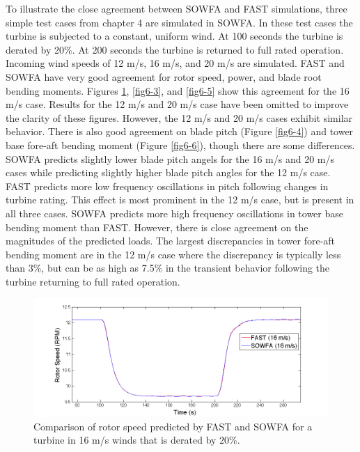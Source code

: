 To illustrate the close agreement between SOWFA and FAST simulations, three simple test cases from chapter 4 are simulated in SOWFA. In these test cases the turbine is subjected to a constant, uniform wind. At 100 seconds the turbine is derated by 20\%. At 200 seconds the turbine is returned to full rated operation. Incoming wind speeds of 12 m/s, 16 m/s, and 20 m/s are simulated. FAST and SOWFA have very good agreement for rotor speed, power, and blade root bending moments. Figures \ref{fig6-2}, \ref{fig6-3}, and \ref{fig6-5} show this agreement for the 16 m/s case. Results for the 12 m/s and 20 m/s case have been omitted to improve the clarity of these figures. However, the 12 m/s and 20 m/s cases exhibit similar behavior. There is also good agreement on blade pitch (Figure \ref{fig6-4}) and tower base fore-aft bending moment (Figure \ref{fig6-6}), though there are some differences. SOWFA predicts slightly lower blade pitch angels for the 16 m/s and 20 m/s cases while predicting slightly higher blade pitch angles for the 12 m/s case. FAST predicts more low frequency oscillations in pitch following changes in turbine rating. This effect is most prominent in the 12 m/s case, but is present in all three cases. SOWFA predicts more high frequency oscillations in tower base bending moment than FAST. However, there is close agreement on the magnitudes of the predicted loads. The largest discrepancies in tower fore-aft bending moment are in the 12 m/s case where the discrepancy is typically less than 3\%, but can be as high as 7.5\% in the transient behavior following the turbine returning to full rated operation. 

\begin{figure}[ht]
	\centering
	\includegraphics[width = .95\linewidth]{Figures/ch6Figures/fig6-2.png}		
	\caption{Comparison of rotor speed predicted by FAST and SOWFA for a turbine in 16 m/s winds that is derated by 20\%. }
		\label{fig6-2}
\end{figure}


